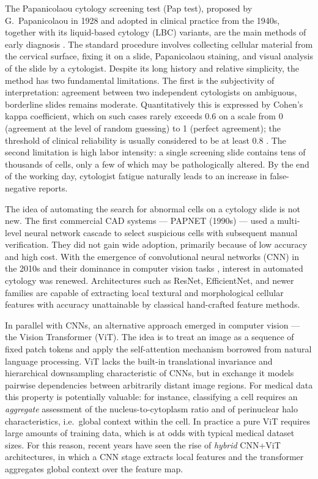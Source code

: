 \documentclass[14pt,a4paper]{extreport}
\begin{document}
The Papanicolaou cytology screening test (Pap test), proposed by
G.~Papanicolaou in 1928 and adopted in clinical practice from the 1940s,
together with its liquid-based cytology (LBC) variants, are the main
methods of early diagnosis \cite{hashmi2020comparison}. The standard
procedure involves collecting cellular material from the cervical
surface, fixing it on a slide, Papanicolaou staining, and visual
analysis of the slide by a cytologist. Despite its long history and
relative simplicity, the method has two fundamental limitations. The
first is the subjectivity of interpretation: agreement between two
independent cytologists on ambiguous, borderline slides remains
moderate. Quantitatively this is expressed by Cohen's kappa coefficient,
which on such cases rarely exceeds 0.6 on a scale from 0 (agreement at
the level of random guessing) to 1 (perfect agreement); the threshold of
clinical reliability is usually considered to be at least 0.8
\cite{branca2015recommendations}. The second limitation is high labor
intensity: a single screening slide contains tens of thousands of cells,
only a few of which may be pathologically altered. By the end of the
working day, cytologist fatigue naturally leads to an increase in
false-negative reports.

The idea of automating the search for abnormal cells on a cytology slide
is not new. The first commercial CAD systems --- PAPNET (1990s) --- used
a multi-level neural network cascade to select suspicious cells with
subsequent manual verification. They did not gain wide adoption,
primarily because of low accuracy and high cost. With the emergence of
convolutional neural networks (CNN) in the 2010s and their dominance in
computer vision tasks \cite{lecun2015deep}, interest in automated
cytology was renewed. Architectures such as ResNet, EfficientNet, and
newer families are capable of extracting local textural and
morphological cellular features with accuracy unattainable by classical
hand-crafted feature methods.

In parallel with CNNs, an alternative approach emerged in computer
vision --- the Vision Transformer (ViT). The idea is to treat an image
as a sequence of fixed patch tokens and apply the self-attention
mechanism borrowed from natural language processing. ViT lacks the
built-in translational invariance and hierarchical downsampling
characteristic of CNNs, but in exchange it models pairwise dependencies
between arbitrarily distant image regions. For medical data this
property is potentially valuable: for instance, classifying a cell
requires an \textit{aggregate} assessment of the nucleus-to-cytoplasm
ratio and of perinuclear halo characteristics, i.e.\ global context
within the cell. In practice a pure ViT requires large amounts of
training data, which is at odds with typical medical dataset sizes. For
this reason, recent years have seen the rise of \textit{hybrid} CNN+ViT
architectures, in which a CNN stage extracts local features and the
transformer aggregates global context over the feature map.
\end{document}
